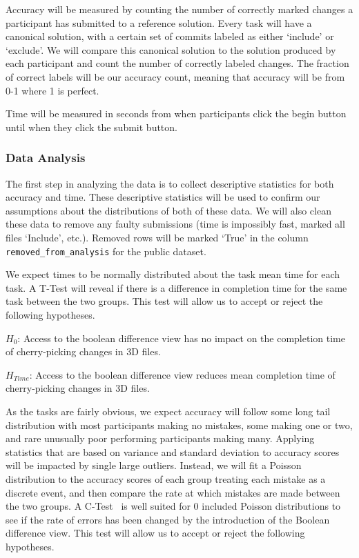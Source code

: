\documentclass[sigconf,authorversion,nonacm]{acmart}
\begin{document}
Accuracy will be measured by counting the number of correctly marked changes a participant has submitted to a reference solution.
Every task will have a canonical solution, with a certain set of commits labeled as either `include' or `exclude'.
We will compare this canonical solution to the solution produced by each participant and count the number of correctly labeled changes.
The fraction of correct labels will be our accuracy count, meaning that accuracy will be from 0-1 where 1 is perfect.

Time will be measured in seconds from when participants click the begin button until when they click the submit button.

\subsubsection{Data Analysis}

The first step in analyzing the data is to collect descriptive statistics for both accuracy and time.
These descriptive statistics will be used to confirm our assumptions about the distributions of both of these data.
We will also clean these data to remove any faulty submissions (time is impossibly fast, marked all files `Include', etc.).
Removed rows will be marked `True' in the column \texttt{removed\_from\_analysis} for the public dataset.

We expect times to be normally distributed about the task mean time for each task.
A T-Test will reveal if there is a difference in completion time for the same task between the two groups.
This test will allow us to accept or reject the following hypotheses.

$H_{0}$: Access to the boolean difference view has no impact on the completion time of cherry-picking changes in 3D files.

$H_{Time}$: Access to the boolean difference view reduces mean completion time of cherry-picking changes in 3D files.

As the tasks are fairly obvious, we expect accuracy will follow some long tail distribution with most participants making no mistakes, some making one or two, and rare unusually poor performing participants making many.
Applying statistics that are based on variance and standard deviation to accuracy scores will be impacted by single large outliers.
Instead, we will fit a Poisson distribution to the accuracy scores of each group treating each mistake as a discrete event, and then compare the rate at which mistakes are made between the two groups.
A C-Test~\cite{przyborowski1940homogeneity} is well suited for 0 included Poisson distributions to see if the rate of errors has been changed by the introduction of the Boolean difference view.
This test will allow us to accept or reject the following hypotheses.
\end{document}
